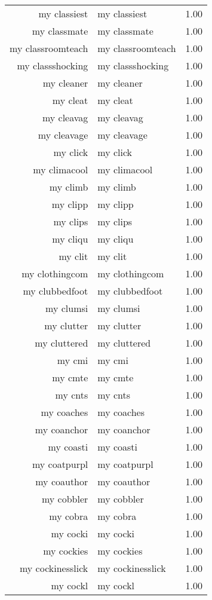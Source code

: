 \begin{table}[ht]
\begin{tabular}{rlr}
  my classiest & my classiest & 1.00 \\ 
  my classmate & my classmate & 1.00 \\ 
  my classroomteach & my classroomteach & 1.00 \\ 
  my classshocking & my classshocking & 1.00 \\ 
  my cleaner & my cleaner & 1.00 \\ 
  my cleat & my cleat & 1.00 \\ 
  my cleavag & my cleavag & 1.00 \\ 
  my cleavage & my cleavage & 1.00 \\ 
  my click & my click & 1.00 \\ 
  my climacool & my climacool & 1.00 \\ 
  my climb & my climb & 1.00 \\ 
  my clipp & my clipp & 1.00 \\ 
  my clips & my clips & 1.00 \\ 
  my cliqu & my cliqu & 1.00 \\ 
  my clit & my clit & 1.00 \\ 
  my clothingcom & my clothingcom & 1.00 \\ 
  my clubbedfoot & my clubbedfoot & 1.00 \\ 
  my clumsi & my clumsi & 1.00 \\ 
  my clutter & my clutter & 1.00 \\ 
  my cluttered & my cluttered & 1.00 \\ 
  my cmi & my cmi & 1.00 \\ 
  my cmte & my cmte & 1.00 \\ 
  my cnts & my cnts & 1.00 \\ 
  my coaches & my coaches & 1.00 \\ 
  my coanchor & my coanchor & 1.00 \\ 
  my coasti & my coasti & 1.00 \\ 
  my coatpurpl & my coatpurpl & 1.00 \\ 
  my coauthor & my coauthor & 1.00 \\ 
  my cobbler & my cobbler & 1.00 \\ 
  my cobra & my cobra & 1.00 \\ 
  my cocki & my cocki & 1.00 \\ 
  my cockies & my cockies & 1.00 \\ 
  my cockinesslick & my cockinesslick & 1.00 \\ 
  my cockl & my cockl & 1.00 \\ 

\end{tabular}
\end{table}
